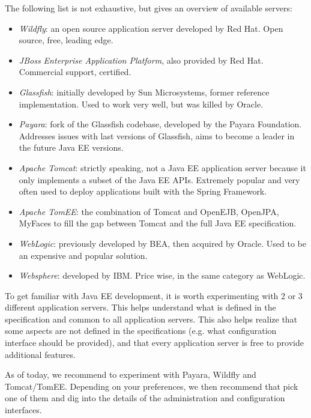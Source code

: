 The following list is not exhaustive, but gives an overview of available servers:

\begin{itemize}
\item \emph{Wildfly}: an open source application server developed by Red Hat. Open source, free, leading edge.
\item \emph{JBoss Enterprise Application Platform}, also provided by Red Hat. Commercial support, certified.
\item \emph{Glassfish}: initially developed by Sun Microsystems, former reference implementation. Used to work very well, but was killed by Oracle.
\item \emph{Payara}: fork of the Glassfish codebase, developed by the Payara Foundation. Addresses issues with last versions of Glassfish, aims to become a leader in the future Java EE versions.
\item \emph{Apache Tomcat}: strictly speaking, not a Java EE application server because it only implements a subset of the Java EE APIs. Extremely popular and very often used to deploy applications built with the Spring Framework.
\item \emph{Apache TomEE}: the combination of Tomcat and OpenEJB, OpenJPA, MyFaces to fill the gap between Tomcat and the full Java EE specification.
\item \emph{WebLogic}: previously developed by BEA, then acquired by Oracle. Used to be an expensive and popular solution. 
\item \emph{Websphere}: developed by IBM. Price wise, in the same category as WebLogic.
\end{itemize}


To get familiar with Java EE development, it is worth experimenting with 2 or 3 different application servers. This helps understand what is defined in the specification and common to all application servers. This also helps realize that some aspects are not defined in the specifications (e.g. what configuration interface should be provided), and that every application server is free to provide additional features.

As of today, we recommend to experiment with Payara, Wildfly and Tomcat/TomEE. Depending on your preferences, we then recommend that pick one of them and dig into the details of the administration and configuration interfaces.


